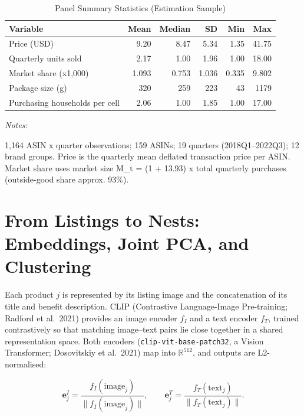 \begin{table}[H]
\centering
\caption{\label{tab:tab_panel_summary}Panel Summary Statistics (Estimation Sample)}
\centering
\fontsize{9}{11}\selectfont
\begin{threeparttable}
\begin{tabular}[t]{lrrrrr}
\toprule
Variable & Mean & Median & SD & Min & Max\\
\midrule
Price (USD) & 9.20 & 8.47 & 5.34 & 1.35 & 41.75\\
Quarterly units sold & 2.17 & 1.00 & 1.96 & 1.00 & 18.00\\
Market share (x1,000) & 1.093 & 0.753 & 1.036 & 0.335 & 9.802\\
Package size (g) & 320 & 259 & 223 & 43 & 1179\\
Purchasing households per cell & 2.06 & 1.00 & 1.85 & 1.00 & 17.00\\
\bottomrule
\end{tabular}
\begin{tablenotes}
\item \textit{Notes: } 
\item 1,164 ASIN x quarter observations; 159 ASINs; 19 quarters (2018Q1--2022Q3); 12 brand groups. Price is the quarterly mean deflated transaction price per ASIN. Market share uses market size M\_t = (1 + 13.93) x total quarterly purchases (outside-good share approx. 93\%).
\end{tablenotes}
\end{threeparttable}
\end{table}

\section{From Listings to Nests: Embeddings, Joint PCA, and
Clustering}\label{from-listings-to-nests-embeddings-joint-pca-and-clustering}

Each product \(j\) is represented by its listing image and the
concatenation of its title and benefit description. CLIP (Contrastive
Language-Image Pre-training; Radford et al.~2021) provides an image
encoder \(f_I\) and a text encoder \(f_T\), trained contrastively so
that matching image--text pairs lie close together in a shared
representation space. Both encoders (\texttt{clip-vit-base-patch32}, a
Vision Transformer; Dosovitskiy et al.~2021) map into
\(\mathbb{R}^{512}\), and outputs are L2-normalised:

\[\mathbf{e}^{I}_{j} = \frac{f_I(\text{image}_j)}{\lVert f_I(\text{image}_j) \rVert}, \qquad
\mathbf{e}^{T}_{j} = \frac{f_T(\text{text}_j)}{\lVert f_T(\text{text}_j) \rVert}.\]

